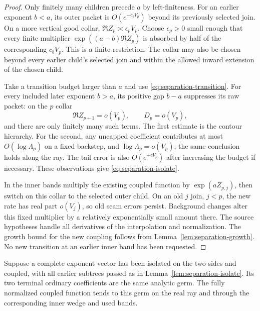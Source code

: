 \begin{proof}
Only finitely many children precede $a$ by left-finiteness.
For an earlier exponent $b<a$, its outer packet is
$O(e^{-c_bV_p})$ beyond its previously selected join.
On a more vertical good collar,
$\Re Z_p\asymp\epsilon_pV_p$.  Choose $\epsilon_p>0$
small enough that every finite multiplier
$\exp((a-b)\Re Z_p)$ is absorbed by half of the corresponding
$c_bV_p$.  This is a finite restriction.  The collar may also
be chosen beyond every earlier child's selected join and within
the allowed inward extension of the chosen child.

Take a transition budget larger than $a$ and use
\eqref{eq:separation-transition}.  For every included later
exponent $b>a$, its positive gap $b-a$ suppresses its raw
packet: on the $p$ collar
\[
 \Re Z_{p+1}=o(V_p),\qquad D_p=o(V_p),
\]
and there are only finitely many such terms.  The first estimate
is the contour hierarchy.  For the second, any uncapped
coefficient contributes at most $O(\log\Lambda_p)$ on a fixed
backstep, and $\log\Lambda_p=o(V_p)$; the same conclusion
holds along the ray.  The tail error is also
$O(e^{-cV_p})$ after increasing the budget if necessary.
These observations give \eqref{eq:separation-isolate}.

In the inner bands multiply the existing coupled function by
$\exp(a Z_{p,j})$, then switch on this collar to the selected
outer child.  On an old $j$ join, $j<p$, the new rate has real
part $o(V_j)$, so old seam errors persist.  Background changes
alter this fixed multiplier by a relatively exponentially small
amount there.  The source hypotheses handle all derivatives of
the interpolation and normalization.  The growth bound for the
new coupling follows from Lemma~\ref{lem:separation-growth}.
No new transition at an earlier inner band has been requested.
\end{proof}

\begin{lemma}
\label{lem:separation-terminal}
Suppose a complete exponent vector has been isolated on the two
sides and coupled, with all earlier subtrees passed as in
Lemma~\ref{lem:separation-isolate}.  Its two terminal ordinary
coefficients are the same analytic germ.  The fully normalized
coupled function tends to this germ on the real ray and through
the corresponding inner wedge and used bands.
\end{lemma}

